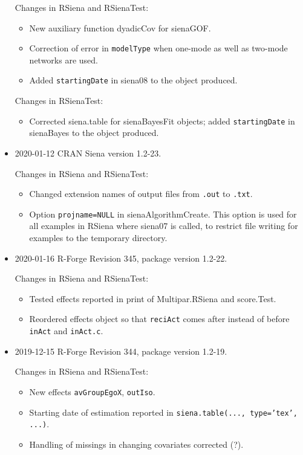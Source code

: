 \documentclass[a4paper,fleqn,11pt]{article}
\newcommand{\+}{\, + \,}
\newcommand{\sfn}[1]{\textsf{#1}}
\begin{document}
\begin{small}
\begin{itemize}
Changes in RSiena and RSienaTest:
\begin{itemize}
\item New auxiliary function \sfn{dyadicCov} for \sfn{sienaGOF}.
\item Correction of error in \texttt{modelType} when one-mode as well as two-mode
     networks are used.
\item Added \texttt{startingDate} in \sfn{siena08} to the object produced.
\end{itemize}

Changes in RSienaTest:
\begin{itemize}
   \item Corrected \sfn{siena.table} for \sfn{sienaBayesFit} objects;
     added \texttt{startingDate} in \sfn{sienaBayes} to the object produced.
\end{itemize}


\item 2020-01-12 CRAN Siena version 1.2-23.

Changes in RSiena and RSienaTest:
\begin{itemize}
\item Changed extension names of output files from \texttt{.out} to
    \texttt{.txt}.
\item Option \texttt{projname=NULL} in \sfn{sienaAlgorithmCreate}.
     This option is used for all examples in \sfn{RSiena} where \sfn{siena07} is called,
     to restrict file writing for examples to the temporary directory.
\end{itemize}



\item 2020-01-16 R-Forge Revision 345, package version 1.2-22.

Changes in RSiena and RSienaTest:
\begin{itemize}
\item Tested effects reported in print of \sfn{Multipar.RSiena} and
        \sfn{score.Test}.
\item Reordered effects object so that \texttt{reciAct} comes after instead of
     before \texttt{inAct} and \texttt{inAct.c}.
\end{itemize}


\item 2019-12-15 R-Forge Revision 344, package version 1.2-19.

Changes in RSiena and RSienaTest:
\begin{itemize}
 \item New effects \texttt{avGroupEgoX}, \texttt{outIso}.
 \item Starting date of estimation reported in
     \texttt{siena.table(..., type='tex', ...)}.
\item Handling of missings in changing covariates corrected (?).
\end{itemize}


\end{itemize}
\end{small}
\end{document}
